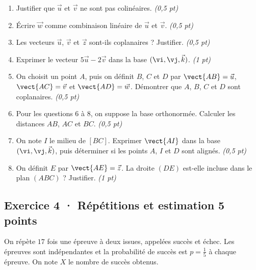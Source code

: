 \begin{enumerate}

\item Justifier que $\vec u$ et $\vec v$ ne sont pas colinéaires. \hfill\textit{(0,5 pt)}

\item Écrire $\vec w$ comme combinaison linéaire de $\vec u$ et $\vec v$. \hfill\textit{(0,5 pt)}

\item Les vecteurs $\vec u$, $\vec v$ et $\vec z$ sont-ils coplanaires ? Justifier. \hfill\textit{(0,5 pt)}

\item Exprimer le vecteur $5\vec u-2\vec v$ dans la base $(\vi,\vj,\vec k)$. \hfill\textit{(1 pt)}

\item On choisit un point $A$, puis on définit $B$, $C$ et $D$ par $\vect{AB}=\vec u$, $\vect{AC}=\vec v$ et $\vect{AD}=\vec w$. Démontrer que $A$, $B$, $C$ et $D$ sont coplanaires. \hfill\textit{(0,5 pt)}

\item Pour les questions 6 à 8, on suppose la base orthonormée. Calculer les distances $AB$, $AC$ et $BC$. \hfill\textit{(0,5 pt)}

\item On note $I$ le milieu de $[BC]$. Exprimer $\vect{AI}$ dans la base $(\vi,\vj,\vec k)$, puis déterminer si les points $A$, $I$ et $D$ sont alignés. \hfill\textit{(0,5 pt)}

\item On définit $E$ par $\vect{AE}=\vec z$. La droite $(DE)$ est-elle incluse dans le plan $(ABC)$ ? Justifier. \hfill\textit{(1 pt)}

\end{enumerate}

\subsection*{Exercice 4 · Répétitions et estimation \hfill 5 points}On répète $17$ fois une épreuve à deux issues, appelées succès et échec. Les épreuves sont indépendantes et la probabilité de succès est $p=\frac{1}{5}$ à chaque épreuve. On note $X$ le nombre de succès obtenus.

